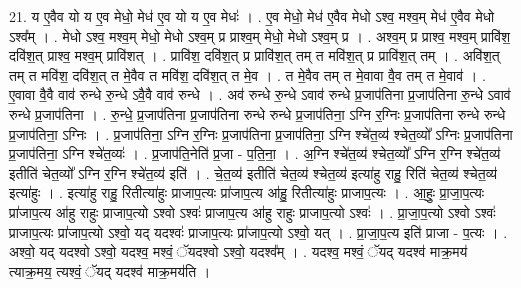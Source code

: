 \documentclass[17pt]{extarticle}
\begin{document}
21. य ए॒वैव यो य ए॒व मेधो॒ मेध॑ ए॒व यो य ए॒व मेधः॑ । . ए॒व मेधो॒ मेध॑ ए॒वैव मेधो ऽश्व॒ मश्व॒म् मेध॑ ए॒वैव मेधो ऽश्व᳚म् । . मेधो ऽश्व॒ मश्व॒म् मेधो॒ मेधो ऽश्व॒म् प्र प्राश्व॒म् मेधो॒ मेधो ऽश्व॒म् प्र । . अश्व॒म् प्र प्राश्व॒ मश्व॒म् प्रावि॑श॒ दवि॑श॒त् प्राश्व॒ मश्व॒म् प्रावि॑शत् । . प्रावि॑श॒ दवि॑श॒त् प्र प्रावि॑श॒त् तम् त मवि॑श॒त् प्र प्रावि॑श॒त् तम् । . अवि॑श॒त् तम् त मवि॑श॒ दवि॑श॒त् त मे॒वैव त मवि॑श॒ दवि॑श॒त् त मे॒व । . त मे॒वैव तम् त मे॒वावा वै॒व तम् त मे॒वाव॑ । . ए॒वावा वै॒वै वाव॑ रुन्धे रु॒न्धे ऽवै॒वै वाव॑ रुन्धे । . अव॑ रुन्धे रु॒न्धे ऽवाव॑ रुन्धे प्र॒जाप॑तिना प्र॒जाप॑तिना रु॒न्धे ऽवाव॑ रुन्धे प्र॒जाप॑तिना । . रु॒न्धे॒ प्र॒जाप॑तिना प्र॒जाप॑तिना रुन्धे रुन्धे प्र॒जाप॑तिना॒ ऽग्नि र॒ग्निः प्र॒जाप॑तिना रुन्धे रुन्धे प्र॒जाप॑तिना॒ ऽग्निः । . प्र॒जाप॑तिना॒ ऽग्नि र॒ग्निः प्र॒जाप॑तिना प्र॒जाप॑तिना॒ ऽग्नि श्चे॑त॒व्य॑ श्चेत॒व्यो᳚ ऽग्निः प्र॒जाप॑तिना प्र॒जाप॑तिना॒ ऽग्नि श्चे॑त॒व्यः॑ । . प्र॒जाप॑ति॒नेति॑ प्र॒जा - प॒ति॒ना॒ । . अ॒ग्नि श्चे॑त॒व्य॑ श्चेत॒व्यो᳚ ऽग्नि र॒ग्नि श्चे॑त॒व्य॑ इतीति॑ चेत॒व्यो᳚ ऽग्नि र॒ग्नि श्चे॑त॒व्य॑ इति॑ । . चे॒त॒व्य॑ इतीति॑ चेत॒व्य॑ श्चेत॒व्य॑ इत्या॑हु राहु॒ रिति॑ चेत॒व्य॑ श्चेत॒व्य॑ इत्या॑हुः । . इत्या॑हु राहु॒ रितीत्या॑हुः प्राजाप॒त्यः प्रा॑जाप॒त्य आ॑हु॒ रितीत्या॑हुः प्राजाप॒त्यः । . आ॒हुः॒ प्रा॒जा॒प॒त्यः प्रा॑जाप॒त्य आ॑हु राहुः प्राजाप॒त्यो ऽश्वो ऽश्वः॑ प्राजाप॒त्य आ॑हु राहुः प्राजाप॒त्यो ऽश्वः॑ । . प्रा॒जा॒प॒त्यो ऽश्वो ऽश्वः॑ प्राजाप॒त्यः प्रा॑जाप॒त्यो ऽश्वो॒ यद् यदश्वः॑ प्राजाप॒त्यः प्रा॑जाप॒त्यो ऽश्वो॒ यत् । . प्रा॒जा॒प॒त्य इति॑ प्राजा - प॒त्यः । . अश्वो॒ यद् यदश्वो ऽश्वो॒ यदश्व॒ मश्वं॒ ॅयदश्वो ऽश्वो॒ यदश्व᳚म् । . यदश्व॒ मश्वं॒ ॅयद् यदश्व॑ माक्र॒मय॑ त्याक्र॒मय॒ त्यश्वं॒ ॅयद् यदश्व॑ माक्र॒मय॑ति । \newline
\end{document}
